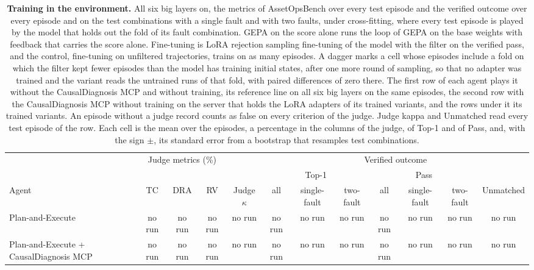 \documentclass[10pt]{article}
\begin{document}
\begin{table}[H]\centering\footnotesize
\caption{\textbf{Training in the environment.} All six big layers on, the metrics of AssetOpsBench over every test episode and the verified outcome over every episode and on the test combinations with a single fault and with two faults, under cross-fitting, where every test episode is played by the model that holds out the fold of its fault combination. GEPA on the score alone runs the loop of GEPA on the base weights with feedback that carries the score alone. Fine-tuning is LoRA rejection sampling fine-tuning of the model with the filter on the verified pass, and the control, fine-tuning on unfiltered trajectories, trains on as many episodes. A dagger marks a cell whose episodes include a fold on which the filter kept fewer episodes than the model has training initial states, after one more round of sampling, so that no adapter was trained and the variant reads the untrained runs of that fold, with paired differences of zero there. The first row of each agent plays it without the CausalDiagnosis MCP and without training, its reference line on all six big layers on the same episodes, the second row with the CausalDiagnosis MCP without training on the server that holds the LoRA adapters of its trained variants, and the rows under it its trained variants. An episode without a judge record counts as false on every criterion of the judge. Judge kappa and Unmatched read every test episode of the row. Each cell is the mean over the episodes, a percentage in the columns of the judge, of Top-1 and of Pass, and, with the sign $\pm$, its standard error from a bootstrap that resamples test combinations.}
\label{tab:training}
\setlength{\tabcolsep}{3pt}
\begin{tabular}{lccccccccccc}
\toprule
 & \multicolumn{3}{c}{Judge metrics (\%)} & & \multicolumn{7}{c}{Verified outcome} \\
\cmidrule(lr){2-4}\cmidrule(l){6-12}
 & & & & & \multicolumn{3}{c}{Top-1} & \multicolumn{3}{c}{Pass} & \\
\cmidrule(lr){6-8}\cmidrule(lr){9-11}
Agent & TC & DRA & RV & Judge $\kappa$ & all & single-fault & two-fault & all & single-fault & two-fault & Unmatched \\
\midrule
Plan-and-Execute & no run & no run & no run & no run & no run & no run & no run & no run & no run & no run & no run \\
Plan-and-Execute + CausalDiagnosis MCP & no run & no run & no run & no run & no run & no run & no run & no run & no run & no run & no run \\

\end{tabular}
\end{table}
\end{document}
